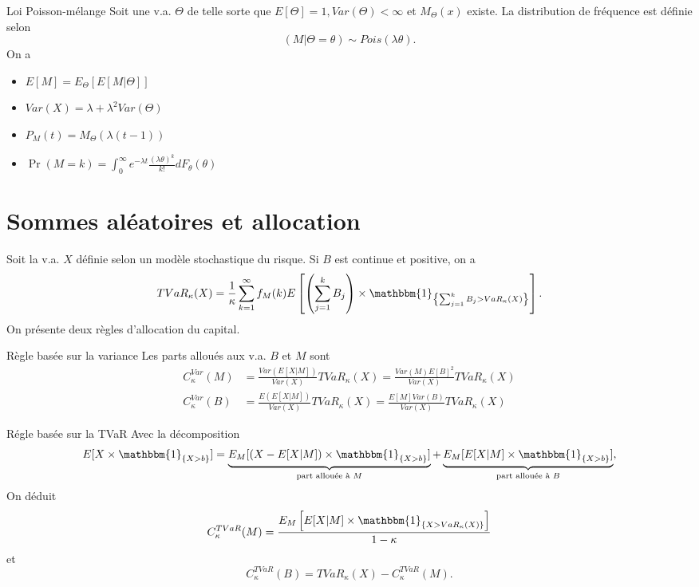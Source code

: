 \begin{definition}{Loi Poisson-mélange}{}
	Soit une v.a. $\Theta$ de telle sorte que $E[\Theta] = 1, Var(\Theta) < \infty$ et $M_\Theta(x)$ existe. La distribution de fréquence est définie selon
	$$(M\vert \Theta = \theta) \sim Pois(\lambda \theta).$$
	On a 
	\begin{itemize}
		\item $\displaystyle E[M] = E_\Theta[E[M \vert \Theta]]$
		\item $\displaystyle Var(X) = \lambda + \lambda^2 Var(\Theta)$
		\item $\displaystyle P_M(t) = M_\Theta(\lambda(t-1))$
		\item $\displaystyle \Pr(M = k) = \int_{0}^{\infty} e^{-\lambda t} \frac{(\lambda \theta)^k}{k!}dF_\theta(\theta)$
	\end{itemize}
\end{definition}

\section{Sommes aléatoires et allocation}

Soit la v.a. $X$ définie selon un modèle stochastique du risque. Si $B$ est continue et positive, on a 
$$TVaR_\kappa(X) = \frac{1}{\kappa}\sum_{k = 1}^{\infty} f_M(k) E\left[ \left(\sum_{j = 1}^{k}B_j\right)\times \mathbbm{1}_{\left\{\sum_{j = 1}^{k}B_j > VaR_\kappa(X)\right\}}\right].$$
On présente deux règles d'allocation du capital. 

\begin{definition}{Règle basée sur la variance}{}
	Les parts alloués aux v.a. $B$ et $M$ sont
	\begin{align*}
	C_\kappa^{Var}(M) &= \frac{Var(E[X\vert M])}{Var(X)} TVaR_\kappa(X) = \frac{Var(M)E[B]^2}{Var(X)} TVaR_\kappa(X)\\
	C_\kappa^{Var}(B) &= \frac{E(E[X\vert M])}{Var(X)} TVaR_\kappa(X) = \frac{E[M]Var(B)}{Var(X)} TVaR_\kappa(X)
	\end{align*}
\end{definition}

\begin{definition}{Régle basée sur la TVaR}{}
	Avec la décomposition 
	$$E[X \times \mathbbm{1}_{\{X>b\}}] = \underbrace{E_M[(X - E[X\vert M])\times \mathbbm{1}_{\{X>b\}}]}_{\text{part allouée à }M} + \underbrace{E_M[E[X\vert M]\times \mathbbm{1}_{\{X>b\}}]}_{\text{part allouée à }B},$$
	On déduit
	$$C_\kappa^{TVaR}(M) = \frac{E_M\left[E[X \vert M] \times \mathbbm{1}_{\{X>VaR_\kappa(X)\}}\right]}{1 - \kappa}$$
	et
	$$C_\kappa^{TVaR}(B) = TVaR_\kappa(X) - C_\kappa^{TVaR}(M).$$
\end{definition}

